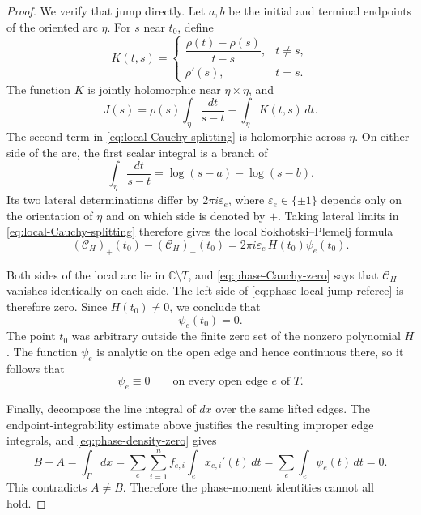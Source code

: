 \documentclass[11pt]{article}
\numberwithin{equation}{section}
\theoremstyle{definition}
\theoremstyle{remark}
\newcommand{\C}{\mathbb C}
\begin{document}
\begin{proof}
We verify that jump directly.  Let $a,b$ be the initial and terminal endpoints
of the oriented arc $\eta$.  For $s$ near $t_0$, define
\[
  K(t,s)=
  \begin{cases}
    \dfrac{\rho(t)-\rho(s)}{t-s},&t\ne s,\\[2mm]
    \rho'(s),&t=s.
  \end{cases}
\]
The function $K$ is jointly holomorphic near $\eta\times\eta$, and
\begin{equation}\label{eq:local-Cauchy-splitting}
  J(s)
  =\rho(s)\int_\eta\frac{dt}{s-t}
   -\int_\eta K(t,s)\,dt.
\end{equation}
The second term in \eqref{eq:local-Cauchy-splitting} is holomorphic across
$\eta$.  On either side of the arc, the first scalar integral is a branch of
\[
  \int_\eta\frac{dt}{s-t}
  =\log(s-a)-\log(s-b).
\]
Its two lateral determinations differ by
$2\pi i\varepsilon_e$, where $\varepsilon_e\in\{\pm1\}$ depends only on the
orientation of $\eta$ and on which side is denoted by $+$.  Taking lateral
limits in \eqref{eq:local-Cauchy-splitting} therefore gives the local
Sokhotski--Plemelj formula
\begin{equation}\label{eq:phase-local-jump-referee}
  (\mathcal C_H)_+(t_0)-(\mathcal C_H)_-(t_0)
  =2\pi i\varepsilon_e\,H(t_0)\psi_e(t_0).
\end{equation}

Both sides of the local arc lie in $\C\setminus T$, and
\eqref{eq:phase-Cauchy-zero} says that $\mathcal C_H$ vanishes identically on
each side.  The left side of \eqref{eq:phase-local-jump-referee} is therefore
zero.  Since $H(t_0)\ne0$, we conclude that
\[
  \psi_e(t_0)=0.
\]
The point $t_0$ was arbitrary outside the finite zero set of the nonzero
polynomial $H$.  The function $\psi_e$ is analytic on the open edge and hence
continuous there, so it follows that
\begin{equation}\label{eq:phase-density-zero}
  \psi_e\equiv0
  \qquad\text{on every open edge }e\text{ of }T.
\end{equation}

Finally, decompose the line integral of $dx$ over the same lifted edges.  The
endpoint-integrability estimate above justifies the resulting improper edge
integrals, and \eqref{eq:phase-density-zero} gives
\[
  B-A
  =\int_\Gamma dx
  =\sum_e\sum_{i=1}^n f_{e,i}\int_e x_{e,i}'(t)\,dt
  =\sum_e\int_e\psi_e(t)\,dt
  =0.
\]
This contradicts $A\ne B$.  Therefore the phase-moment identities cannot all
hold.
\end{proof}
\end{document}
